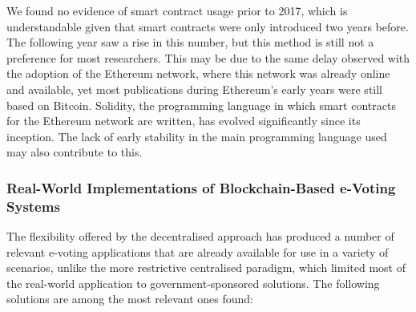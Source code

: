 \documentclass[../access.tex]{subfiles}
\begin{document}
\par
We found no evidence of smart contract usage prior to 2017, which is understandable given that smart contracts were only introduced two years before. The following year saw a rise in this number, but this method is still not a preference for most researchers. This may be due to the same delay observed with the adoption of the Ethereum network, where this network was already online and available, yet most publications during Ethereum's early years were still based on Bitcoin. Solidity, the programming language in which smart contracts for the Ethereum network are written, has evolved significantly since its inception. The lack of early stability in the main programming language used may also contribute to this.

\subsubsection{Real-World Implementations of Blockchain-Based e-Voting Systems}
\label{real-world-decentralized-solutions}
The flexibility offered by the decentralised approach has produced a number of relevant e-voting applications that are already available for use in a variety of scenarios, unlike the more restrictive centralised paradigm, which limited most of the real-world application to government-sponsored solutions. The following solutions are among the most relevant ones found:
\end{document}

